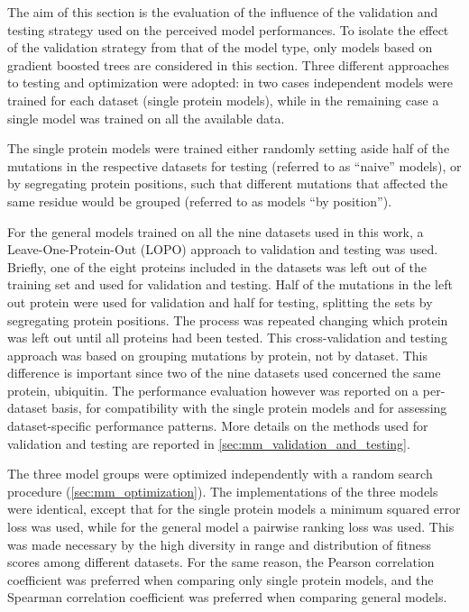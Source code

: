 The aim of this section is the evaluation of the influence of the validation and testing strategy used on the perceived model performances.
To isolate the effect of the validation strategy from that of the model type, only models based on gradient boosted trees are considered in this section.
Three different approaches to testing and optimization were adopted: in two cases independent models were trained for each dataset (single protein models), while in the remaining case a single model was trained on all the available data.

The single protein models were trained either randomly setting aside half of the mutations in the respective datasets for testing (referred to as ``naive'' models), or by segregating protein positions, such that different mutations that affected the same residue would be grouped (referred to as models ``by position'').

For the general models trained on all the nine datasets used in this work, a Leave-One-Protein-Out (LOPO) approach to validation and testing was used.
Briefly, one of the eight proteins included in the datasets was left out of the training set and used for validation and testing. Half of the mutations in the left out protein were used for validation and half for testing, splitting the sets by segregating protein positions.
The process was repeated changing which protein was left out until all proteins had been tested.
This cross-validation and testing approach was based on grouping mutations by protein, not by dataset.
This difference is important since two of the nine datasets used concerned the same protein, ubiquitin.
The performance evaluation however was reported on a per-dataset basis, for compatibility with the single protein models and for assessing dataset-specific performance patterns.
More details on the methods used for validation and testing are reported in \autoref{sec:mm_validation_and_testing}.

The three model groups were optimized independently with a random search procedure (\autoref{sec:mm_optimization}).
The implementations of the three models were identical, except that for the single protein models a minimum squared error loss was used, while for the general model a pairwise ranking loss was used.
This was made necessary by the high diversity in range and distribution of fitness scores among different datasets.
For the same reason, the Pearson correlation coefficient was preferred when comparing only single protein models, and the Spearman correlation coefficient was preferred when comparing general models.


